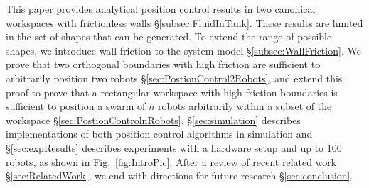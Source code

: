 This paper provides analytical position control results in two canonical workspaces with frictionless walls \S\ref{subsec:FluidInTank}.  These results are limited in the set of shapes that can be generated.  To extend the range of possible shapes, we introduce wall friction to the system model \S \ref{subsec:WallFriction}.  We prove that two orthogonal boundaries with high friction are sufficient to arbitrarily position two robots \S \ref{sec:PostionControl2Robots}, and extend this proof to prove that a rectangular workspace with high friction boundaries is sufficient to position a swarm of $n$ robots arbitrarily within a subset of the workspace \S \ref{sec:PostionControlnRobots}.
\S \ref{sec:simulation} describes implementations of both position control algorithms in simulation and  \S \ref{sec:expResults} describes experiments with a hardware setup and up to 100 robots, as shown in Fig.~\ref{fig:IntroPic}. After a review of recent related work \S \ref{sec:RelatedWork}, we end with directions for future research \S \ref{sec:conclusion}.
